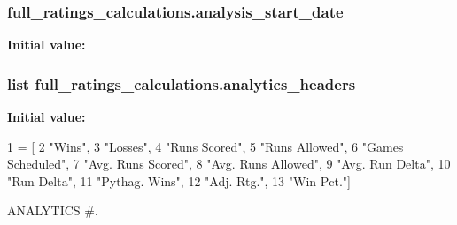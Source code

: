 \subsubsection[{\texorpdfstring{analysis\+\_\+start\+\_\+date}{analysis_start_date}}]{\setlength{\rightskip}{0pt plus 5cm}full\+\_\+ratings\+\_\+calculations.\+analysis\+\_\+start\+\_\+date}\hypertarget{namespacefull__ratings__calculations_ab9c01834b97bd729358e411c51784d9c}{}\label{namespacefull__ratings__calculations_ab9c01834b97bd729358e411c51784d9c}
{\bfseries Initial value\+:}
\subsubsection[{\texorpdfstring{analytics\+\_\+headers}{analytics_headers}}]{\setlength{\rightskip}{0pt plus 5cm}list full\+\_\+ratings\+\_\+calculations.\+analytics\+\_\+headers}\hypertarget{namespacefull__ratings__calculations_aa4a596206d6d9542a6b4bc0a737dfd6a}{}\label{namespacefull__ratings__calculations_aa4a596206d6d9542a6b4bc0a737dfd6a}
{\bfseries Initial value\+:}
\begin{DoxyCode}
1 = [
2     \textcolor{stringliteral}{"Wins"},
3     \textcolor{stringliteral}{"Losses"},
4     \textcolor{stringliteral}{"Runs Scored"},
5     \textcolor{stringliteral}{"Runs Allowed"},
6     \textcolor{stringliteral}{"Games Scheduled"},
7     \textcolor{stringliteral}{"Avg. Runs Scored"},
8     \textcolor{stringliteral}{"Avg. Runs Allowed"},
9     \textcolor{stringliteral}{"Avg. Run Delta"},
10     \textcolor{stringliteral}{"Run Delta"},
11     \textcolor{stringliteral}{"Pythag. Wins"},
12     \textcolor{stringliteral}{"Adj. Rtg."},
13     \textcolor{stringliteral}{"Win Pct."}]
\end{DoxyCode}


A\+N\+A\+L\+Y\+T\+I\+CS \#. 

